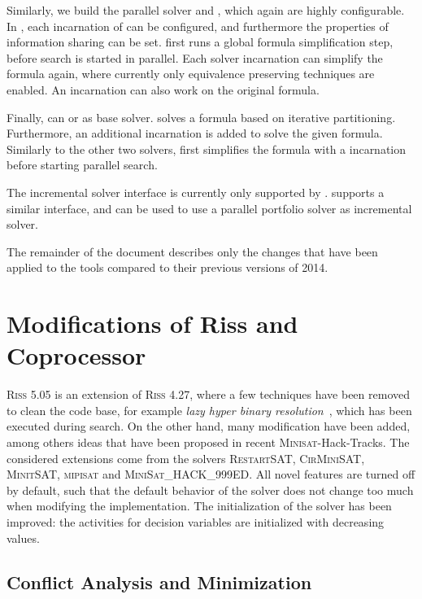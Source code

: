 \documentclass[conference]{IEEEtran}
\begin{document}
Similarly, we build the parallel solver \priss and \pcasso, which again are highly configurable. 
In \priss, each incarnation of \riss can be configured, and furthermore the properties of information sharing can be set. 
\priss first runs a global formula simplification step, before search is started in parallel. 
Each solver incarnation can simplify the formula again, where currently only equivalence preserving techniques are enabled. 
An incarnation can also work on the original formula. 

Finally, \pcasso can \riss or \priss as base solver. 
\pcasso solves a formula based on iterative partitioning. 
Furthermore, an additional \priss incarnation is added to solve the given formula. 
Similarly to the other two solvers, \pcasso first simplifies the formula with a \coprocessor incarnation before starting parallel search.

The incremental solver interface is currently only supported by \riss. 
\priss supports a similar interface, and can be used to use a parallel portfolio solver as incremental solver. 

The remainder of the document describes only the changes that have been applied to the tools compared to their previous versions of 2014.

\section{Modifications of Riss and Coprocessor}

\textsc{Riss 5.05} is an extension of \textsc{Riss 4.27}, where a few techniques have been removed to clean the code base, for example \emph{lazy hyper binary resolution}~\cite{precosat}, which has been executed during search. 
On the other hand, many modification have been added, among others ideas that have been proposed in recent \textsc{Minisat}-Hack-Tracks. 
The considered extensions come from the solvers \textsc{RestartSAT}, \textsc{CirMiniSAT}, \textsc{MinitSAT}, \textsc{mipisat} and \textsc{MiniSat\_HACK\_999ED}. 
All novel features are turned off by default, such that the default behavior of the solver does not change too much when modifying the implementation. 
The initialization of the solver has been improved: the activities for decision variables are initialized with decreasing values. 

\subsection{Conflict Analysis and Minimization}
\end{document}
